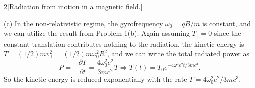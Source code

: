 \documentclass[12pt]{article}
\begin{document}
\begin{problem}{2}[Radiation from motion in a magnetic field.]
\begin{solution}
(c) In the non-relativistic regime, the gyrofrequency $\omega_0=qB/m$ is
constant, and we can utilize the result from Problem 1(b). Again assuming
$T_\|=0$ since the constant translation contributes nothing to the radiation, 
the kinetic energy is $T=(1/2)mv_\perp^2=(1/2)m\omega_0^2R^2$, and we can write 
the total radiated power as
\begin{equation}
    P=-\frac{\partial T}{\partial t}=\frac{4\omega_0^2e^2}{3mc^2}T\Rightarrow
    T(t)=T_0e^{-4\omega_0^2e^2 t/3mc^3}.
\end{equation}
So the kinetic energy is reduced exponentially with the rate
$\Gamma=4\omega_0^2e^2/3mc^3$.

\end{solution}
\end{problem}
\newpage
\end{document}
